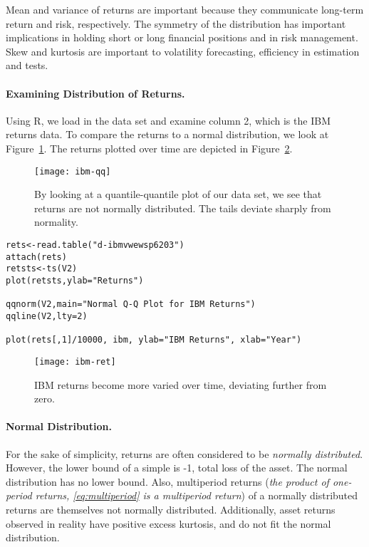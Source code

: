 Mean and variance of returns are important because they communicate long-term return and risk, respectively. The symmetry of the distribution has important implications in holding short or long financial positions and in risk management. Skew and kurtosis are important to volatility forecasting, efficiency in estimation and tests. 

\paragraph{Examining Distribution of Returns.} Using R, we load in the data set and examine column 2, which is the IBM returns data. To compare the returns to a normal distribution, we look at Figure~\ref{figure:ibm-qq}. The returns plotted over time are depicted in Figure~\ref{figure:ibm-ret}.
\begin{figure}[tb]
  \centering
  \texttt{[image: ibm-qq]}
  \caption[Q-Q Plot of Returns]{By looking at a quantile-quantile plot of our data set, we see that returns are not normally distributed. The tails deviate sharply from normality.}
  \label{figure:ibm-qq}
\end{figure}

\begin{verbatim}
rets<-read.table("d-ibmvwewsp6203")
attach(rets)
retsts<-ts(V2)
plot(retsts,ylab="Returns")

qqnorm(V2,main="Normal Q-Q Plot for IBM Returns")
qqline(V2,lty=2)

plot(rets[,1]/10000, ibm, ylab="IBM Returns", xlab="Year")
\end{verbatim}

\begin{figure}[tb]
  \centering
  \texttt{[image: ibm-ret]}
  \caption[IBM Returns]{IBM returns become more varied over time, deviating further from zero.}
  \label{figure:ibm-ret}
\end{figure}

\pagebreak
\paragraph{Normal Distribution.} For the sake of simplicity, returns are often considered to be \emph{\mbox{normally} distributed}. However, the lower bound of a simple is -1, total loss of the asset. The normal distribution has no lower bound. Also, multiperiod returns (\emph{the product of one-period \mbox{returns}, \eqref{eq:multiperiod} is a multiperiod return}) of a normally distributed returns are themselves not normally distributed. Additionally, asset returns observed in reality have positive excess kurtosis, and do not fit the normal distribution.

